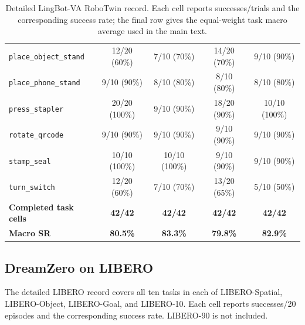 \begin{table}[H]
{\begin{tabular}{lcccc}
        \texttt{place\_object\_stand} & 12/20 (60\%) & 7/10 (70\%) & 14/20 (70\%) & 9/10 (90\%) \\
        \texttt{place\_phone\_stand} & 9/10 (90\%) & 8/10 (80\%) & 8/10 (80\%) & 8/10 (80\%) \\
        \texttt{press\_stapler} & 20/20 (100\%) & 9/10 (90\%) & 18/20 (90\%) & 10/10 (100\%) \\
        \texttt{rotate\_qrcode} & 9/10 (90\%) & 9/10 (90\%) & 9/10 (90\%) & 9/10 (90\%) \\
        \texttt{stamp\_seal} & 10/10 (100\%) & 10/10 (100\%) & 9/10 (90\%) & 9/10 (90\%) \\
        \texttt{turn\_switch} & 12/20 (60\%) & 7/10 (70\%) & 13/20 (65\%) & 5/10 (50\%) \\
        \midrule
        \textbf{Completed task cells} & \textbf{42/42} & \textbf{42/42} & \textbf{42/42} & \textbf{42/42} \\
        \textbf{Macro SR} & \textbf{80.5\%} & \textbf{83.3\%} & \textbf{79.8\%} & \textbf{82.9\%} \\
        \bottomrule
    \end{tabular}}
    \caption{Detailed LingBot-VA RoboTwin record. Each cell reports
    successes/trials and the corresponding success rate; the final row gives
    the equal-weight task macro average used in the main text.}
    \label{tab:lingbot-robotwin-detailed}
\end{table}

\clearpage
\subsection{DreamZero on LIBERO}

The detailed LIBERO record covers all ten tasks in each of LIBERO-Spatial,
LIBERO-Object, LIBERO-Goal, and LIBERO-10. Each cell reports successes/20
episodes and the corresponding success rate. LIBERO-90 is not included.


